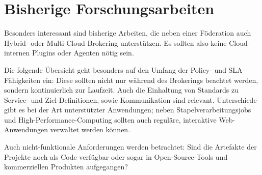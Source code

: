 



%
%

%
%
%
%
%



\section{Bisherige Forschungsarbeiten}

Besonders interessant sind bisherige Arbeiten, die neben einer Föderation auch Hybrid- oder Multi-Cloud-Brokering unterstützen. Es sollten also keine Cloud-internen Plugins oder Agenten nötig sein.

Die folgende Übersicht geht besonders auf den Umfang der Policy- und SLA-Fähigkeiten ein: Diese sollten nicht nur während des Brokerings beachtet werden, sondern kontinuierlich zur Laufzeit. Auch die Einhaltung von Standards zu Service- und Ziel-Definitionen, sowie Kommunikation sind relevant. Unterschiede gibt es bei der Art unterstützter Anwendungen; neben Stapelverarbeitungsjobs und High-Performance-Computing sollten auch reguläre, interaktive Web-Anwendungen verwaltet werden können. 

Auch nicht-funktionale Anforderungen werden betrachtet: Sind die Artefakte der Projekte noch als Code verfügbar oder sogar in Open-Source-Tools und kommerziellen Produkten aufgegangen?



